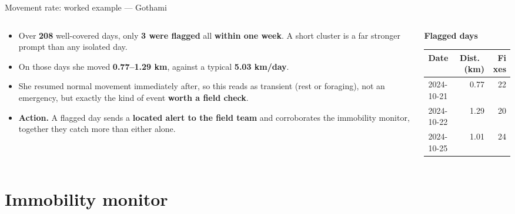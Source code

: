 \documentclass{beamer}
\newcommand{\hi}[1]{\textbf{\textcolor{hicolor}{#1}}}
\begin{document}
	
	\begin{frame}{Movement rate: worked example --- Gothami}
		\begin{columns}[T]
			\begin{column}{0.60\textwidth}
				\small
				\setlength{\itemsep}{6pt}
				\begin{itemize}
					\item Over \hi{208} well-covered days, only \hi{3 were flagged} all
					\hi{within one week}. A short cluster is a far stronger prompt than any
					isolated day.
					\item On those days she moved \hi{0.77--1.29 km}, against a typical
					\hi{5.03 km/day}.
					\item She resumed normal movement immediately after, so this reads as
					transient (rest or foraging), not an emergency, but exactly the kind of
					event \hi{worth a field check}.
					\item \textbf{Action.} A flagged day sends a \hi{located alert to the field
						team} and corroborates the immobility monitor, together they catch
					more than either alone.
				\end{itemize}
			\end{column}
			\begin{column}{0.38\textwidth}
				\centering
				{\footnotesize\textbf{Flagged days}}\\[0.4em]
				{\footnotesize
					\begin{tabular}{lrr}
						\toprule
						Date & Dist.\ (km) & Fixes \\
						\midrule
						2024-10-21 & 0.77 & 22 \\
						2024-10-22 & 1.29 & 20 \\
						2024-10-25 & 1.01 & 24 \\
						\bottomrule
				\end{tabular}}
			\end{column}
		\end{columns}
	\end{frame}
	
	\section{Immobility monitor}
	
\end{document}
